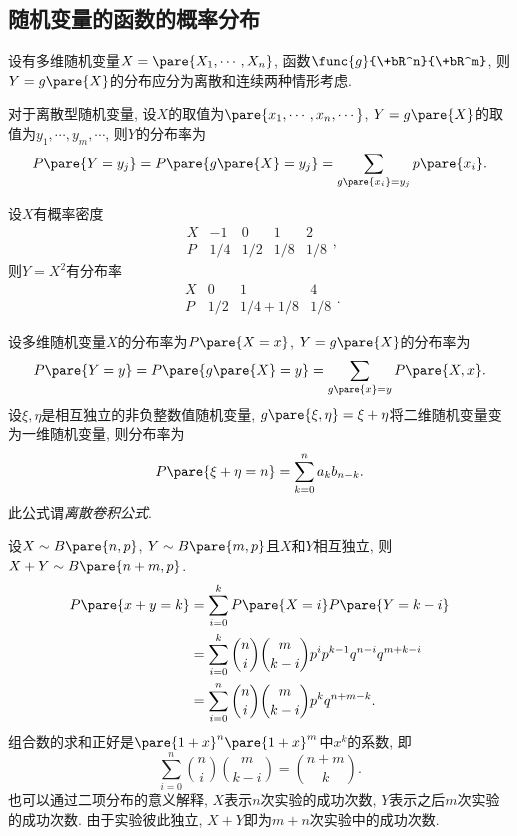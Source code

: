 \documentclass{ctexart}
\begin{document}


\subsection{随机变量的函数的概率分布} %
\label{sub:随机变量的函数的概率分布}

设有多维随机变量$X=\pare{X_1,\cdots,X_n}$, 函数$\func{g}{\+bR^n}{\+bR^m}$, 则$Y = g\pare{X}$的分布应分为离散和连续两种情形考虑.
\par
对于离散型随机变量, 设$X$的取值为$\pare{x_1,\cdots,x_n,\cdots}$, $Y=g\pare{X}$的取值为$y_1,\cdots, y_m,\cdots$, 则$Y$的分布率为
\[ P\pare{Y=y_j} = P\pare{g\pare{X} = y_j} = \sum_{g\pare{x_i} = y_j} p\pare{x_i}. \]
\begin{sample}
    \begin{ex}
        设$X$有概率密度
        \[ \begin{array}{ccccc}
            X & -1 & 0 & 1 & 2 \\
            P & 1/4 & 1/2 & 1/8 & 1/8
        \end{array}, \]
        则$Y=X^2$有分布率
        \[ \begin{array}{cccc}
            X & 0 & 1 &  4 \\
            P & 1/2 & 1/4+1/8 & 1/8
        \end{array}. \]
    \end{ex}
\end{sample}
设多维随机变量$X$的分布率为$P\pare{X=x}$, $Y=g\pare{X}$的分布率为
\[ P\pare{Y=y} = P\pare{g\pare{X} =y} = \sum_{g\pare{x} = y} P\pare{X,x}. \]
设$\xi,\eta$是相互独立的非负整数值随机变量, $g\pare{\xi,\eta} = \xi+\eta$将二维随机变量变为一维随机变量, 则分布率为
\[ P\pare{\xi + \eta = n} = \sum_{k=0}^n a_kb_{n-k}. \]
此公式谓\emph{离散卷积公式}.
\begin{sample}
    \begin{ex}
        设$X\sim B\pare{n,p}$, $Y\sim B\pare{m,p}$且$X$和$Y$相互独立, 则$X+Y\sim B\pare{n+m,p}$.
        \begin{align*}
            P\pare{x+y = k} &= \sum_{i=0}^k P\pare{X=i}P\pare{Y=k-i} \\
            &= \sum_{i=0}^k \binom{n}{i}\binom{m}{k-i} p^ip^{k-1} q^{n-i}q^{m+k-i} \\
            &= \sum_{i=0}^n \binom{n}{i}\binom{m}{k-i} p^k q^{n+m-k}.
        \end{align*}
        组合数的求和正好是$\pare{1+x}^n\pare{1+x}^m$中$x^k$的系数, 即
        \[ \sum_{i=0}^n \binom{n}{i}\binom{m}{k-i} = \binom{n+m}{k}. \]
        也可以通过二项分布的意义解释, $X$表示$n$次实验的成功次数, $Y$表示之后$m$次实验的成功次数. 由于实验彼此独立, $X+Y$即为$m+n$次实验中的成功次数.
    \end{ex}
\end{sample}
\end{document}
